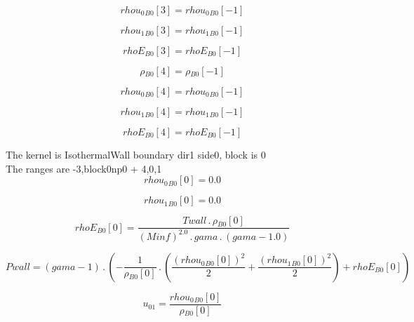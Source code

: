 \documentclass{article}
\begin{document}
\begin{dmath}{rhou_{0}{_{B0}}}[{3}] = {rhou_{0}{_{B0}}}[{-1}]\end{dmath}

\begin{dmath}{rhou_{1}{_{B0}}}[{3}] = {rhou_{1}{_{B0}}}[{-1}]\end{dmath}

\begin{dmath}{rhoE{_{B0}}}[{3}] = {rhoE{_{B0}}}[{-1}]\end{dmath}

\begin{dmath}{\rho{_{B0}}}[{4}] = {\rho{_{B0}}}[{-1}]\end{dmath}

\begin{dmath}{rhou_{0}{_{B0}}}[{4}] = {rhou_{0}{_{B0}}}[{-1}]\end{dmath}

\begin{dmath}{rhou_{1}{_{B0}}}[{4}] = {rhou_{1}{_{B0}}}[{-1}]\end{dmath}

\begin{dmath}{rhoE{_{B0}}}[{4}] = {rhoE{_{B0}}}[{-1}]\end{dmath}

\noindent The kernel is IsothermalWall boundary dir1 side0, block is 0\\\noindent The ranges are -3,block0np0 + 4,0,1\\\begin{dmath}{rhou_{0}{_{B0}}}[{0}] = 0.0\end{dmath}

\begin{dmath}{rhou_{1}{_{B0}}}[{0}] = 0.0\end{dmath}

\begin{dmath}{rhoE{_{B0}}}[{0}] = \frac{Twall \,.\, {\rho{_{B0}}}[{0}]}{\left(Minf \right)^{2.0} \,.\, gama \,.\, \left(gama - 1.0\right)}\end{dmath}

\begin{dmath}Pwall = \left(gama - 1\right) \,.\, \left(- \frac{1}{{\rho{_{B0}}}[{0}]} \,.\, \left(\frac{\left({rhou_{0}{_{B0}}}[{0}] \right)^{2}}{2} + \frac{\left({rhou_{1}{_{B0}}}[{0}] \right)^{2}}{2}\right) + {rhoE{_{B0}}}[{0}]\right)\end{dmath}

\begin{dmath}u_{01} = \frac{{rhou_{0}{_{B0}}}[{0}]}{{\rho{_{B0}}}[{0}]}\end{dmath}
\end{document}
